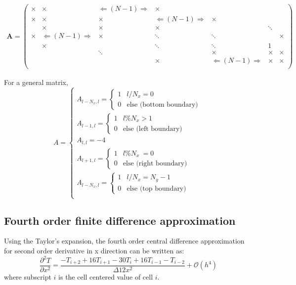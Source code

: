 \documentclass[12pt]{amsart}   %
\begin{document}
\begin{eqnarray} \label{eq:16new}
\textbf{A} = \begin{pmatrix}
\times & \times & \Leftarrow(N-1)\Rightarrow & \times &&&\\
\times & \times & \times & \Leftarrow(N-1)\Rightarrow & \times &&\\
 & \times & \times &\times & &\ddots&\\
\times & \Leftarrow(N-1)\Rightarrow & \times & \ddots &\ddots&&\times\\
 & \times &  & \ddots &\ddots&1&\\
 &  & \ddots & &\times & \times& \times\\
 &  &  &\times &\Leftarrow(N-1)\Rightarrow& \times&\times\\
\end{pmatrix} \nonumber \end{eqnarray}

For a general matrix,
\begin{equation}
A = \begin{cases}
A_{l-N_x,l}= \begin{cases}
1 & l/N_x = 0 \\
0 & \text{else (bottom boundary)}
\end{cases}\\
A_{l-1,l}= \begin{cases}
1 & l\% N_x > 1  \\
0 & \text{else (left boundary)}
\end{cases} \\
A_{l,l}= -4 \\
A_{l+1,l}= \begin{cases}
1 & l\% N_x ~= 0 \\
0 & \text{else (right boundary)}
\end{cases} \\
A_{l-N_x,l}= \begin{cases}
1 & l/N_x = N_y-1 \\
0 & \text{else (top boundary)}
\end{cases}\\
\end{cases}
\end{equation}

\subsection{Fourth order finite difference approximation}
Using the Taylor's expansion, the fourth order central difference approximation for second order derivative in x direction can be written as:
\begin{equation}\label{eq:19}
 \frac{ \partial^2 T}{\partial x^2}=\frac{-T_{i+2}+16T_{i+1} -30T_{i} + 16T_{i-1} - T_{i-2}}{\Delta 12x^2}+\mathcal{O}(h^4)
\end{equation}
where subscript $i$ is the cell centered value of cell $i$.
\end{document}
